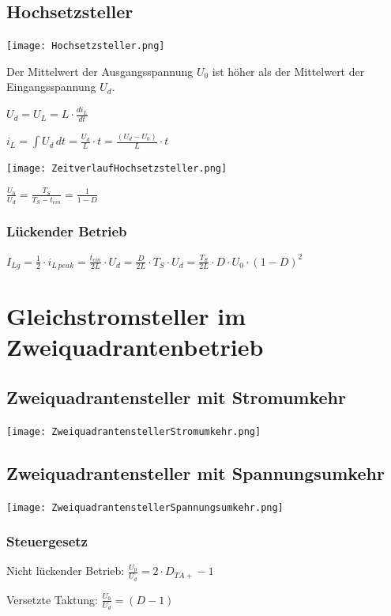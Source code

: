 \documentclass[german]{latex4ei/latex4ei_sheet}
\begin{document}
	\begin{sectionbox}
		\subsection{Hochsetzsteller}
			\begin{bluebox}
				\item \texttt{[image: Hochsetzsteller.png]}
				\item Der Mittelwert der Ausgangsspannung $U_0$ ist höher als der Mittelwert der Eingangsspannung $U_d$.
				\item $U_d = U_L = L \cdot \frac{di_L}{dt}$
				\item $i_L = \int U_d\,dt = \frac{U_d}{L}\cdot t = \frac{(U_d-U_0)}{L}\cdot t$
				\item \texttt{[image: ZeitverlaufHochsetzsteller.png]}
				\item $\frac{U_0}{U_d} = \frac{T_S}{T_S-t_{ein}} = \frac{1}{1-D}$
			\end{bluebox}
			\subsubsection{Lückender Betrieb}
				\begin{bluebox}
					\item $I_{Lg} = \frac{1}{2}\cdot i_{L\,peak} = \frac{t_{ein}}{2L}\cdot U_d = \frac{D}{2L}\cdot T_S\cdot U_d = \frac{T_S}{2L}\cdot D \cdot U_0 \cdot (1-D)^2$
					\item 
				\end{bluebox}
	\end{sectionbox}
\section{Gleichstromsteller im Zweiquadrantenbetrieb}
	\begin{sectionbox}
		\subsection{Zweiquadrantensteller mit Stromumkehr}
			\texttt{[image: ZweiquadrantenstellerStromumkehr.png]}
		\subsection{Zweiquadrantensteller mit Spannungsumkehr}
			\texttt{[image: ZweiquadrantenstellerSpannungsumkehr.png]}
			\subsubsection{Steuergesetz}
				\begin{bluebox}
					\item Nicht lückender Betrieb: $\frac{U_0}{U_d} = 2 \cdot D_{TA+} -1$
					\item Versetzte Taktung: $\frac{U_0}{U_d} = (D -1)$
				\end{bluebox}


	\end{sectionbox}
\end{document}

